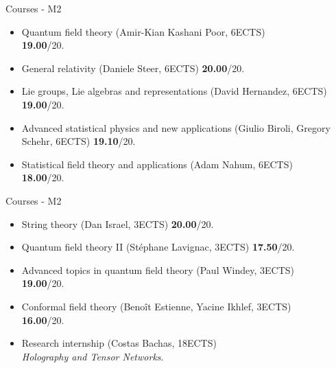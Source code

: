 \documentclass{beamer}
\begin{document}
\begin{frame}{Courses - M2}
\begin{itemize}

\item Quantum field theory (Amir-Kian Kashani Poor, 6ECTS)\\
\hfill \textbf{19.00}/20.

\item General relativity (Daniele Steer, 6ECTS)
\hfill \textbf{20.00}/20.

\item Lie groups, Lie algebras and representations (David Hernandez, 6ECTS)
\hfill \textbf{19.00}/20.

\item Advanced statistical physics and new applications (Giulio Biroli, Gregory Schehr, 6ECTS)
\hfill \textbf{19.10}/20.

\item Statistical field theory and applications (Adam Nahum, 6ECTS)\\
\hfill \textbf{18.00}/20.

\end{itemize}
\end{frame}

\begin{frame}{Courses - M2}
\begin{itemize}

\item String theory (Dan Israel, 3ECTS) \hfill \textbf{20.00}/20.

\item Quantum field theory II (Stéphane Lavignac, 3ECTS) \hfill \textbf{17.50}/20.

\item Advanced topics in quantum field theory (Paul Windey, 3ECTS)\\
\hfill \textbf{19.00}/20.

\item Conformal field theory (Benoît Estienne, Yacine Ikhlef, 3ECTS)\\
\hfill \textbf{16.00}/20.

\vspace{5mm}

\item Research internship (Costas Bachas, 18ECTS)\\
\quad \textit{Holography and Tensor Networks}.

\end{itemize}
\end{frame}
\end{document}
